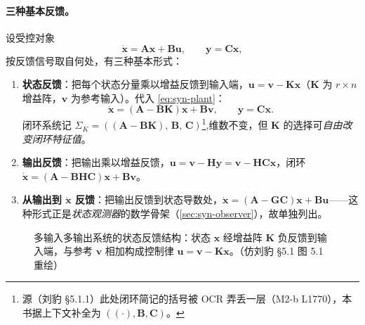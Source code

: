 \paragraph{三种基本反馈。}
设受控对象
\begin{equation}
  \dot{\mathbf x}=\mathbf A\mathbf x+\mathbf B\mathbf u,\qquad \mathbf y=\mathbf C\mathbf x,
  \label{eq:syn-plant}
\end{equation}
按反馈信号取自何处，有三种基本形式\cite{liubao2006modern}：

\begin{enumerate}
  \item \textbf{状态反馈}：把每个状态分量乘以增益反馈到输入端，$\mathbf u=\mathbf v-\mathbf K\mathbf x$（$\mathbf K$ 为 $r\times n$ 增益阵，$\mathbf v$ 为参考输入）。代入 \cref{eq:syn-plant}：
  \begin{equation}
    \dot{\mathbf x}=(\mathbf A-\mathbf B\mathbf K)\mathbf x+\mathbf B\mathbf v,\qquad \mathbf y=\mathbf C\mathbf x.
    \label{eq:syn-state-fb}
  \end{equation}
  闭环系统记 $\Sigma_K=((\mathbf A-\mathbf B\mathbf K),\,\mathbf B,\,\mathbf C)$\footnote{源（刘豹 §5.1.1）此处闭环简记的括号被 OCR 弄丢一层（M2-b L1770），本书据上下文补全为 $((\cdot),\mathbf B,\mathbf C)$。},维数不变，但 $\mathbf K$ 的选择可\emph{自由改变闭环特征值}。
  \item \textbf{输出反馈}：把输出乘以增益反馈，$\mathbf u=\mathbf v-\mathbf H\mathbf y=\mathbf v-\mathbf H\mathbf C\mathbf x$，闭环 $\dot{\mathbf x}=(\mathbf A-\mathbf B\mathbf H\mathbf C)\mathbf x+\mathbf B\mathbf v$。
  \item \textbf{从输出到 $\dot{\mathbf x}$ 反馈}：把输出反馈到状态导数处，$\dot{\mathbf x}=(\mathbf A-\mathbf G\mathbf C)\mathbf x+\mathbf B\mathbf u$——这种形式正是\emph{状态观测器}的数学骨架（\cref{sec:syn-observer}），故单独列出。
\end{enumerate}

\begin{figure}[H]
\centering
{}
\caption{多输入多输出系统的状态反馈结构：状态 $\mathbf x$ 经增益阵 $\mathbf K$ 负反馈到输入端，与参考 $\mathbf v$ 相加构成控制律 $\mathbf u=\mathbf v-\mathbf K\mathbf x$。（仿刘豹 §5.1 图 5.1 重绘）}
\label{fig:syn-state-fb}
\end{figure}

